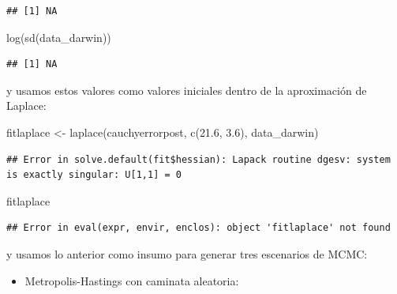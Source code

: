 \documentclass[
  12pt,
]{book}
\newenvironment{Shaded}{\begin{snugshade}}{\end{snugshade}}
\newcommand{\AttributeTok}[1]{\textcolor[rgb]{0.77,0.63,0.00}{#1}}
\newcommand{\FloatTok}[1]{\textcolor[rgb]{0.00,0.00,0.81}{#1}}
\newcommand{\FunctionTok}[1]{\textcolor[rgb]{0.00,0.00,0.00}{#1}}
\newcommand{\NormalTok}[1]{#1}
\newcommand{\OtherTok}[1]{\textcolor[rgb]{0.56,0.35,0.01}{#1}}
\newcommand{\SpecialCharTok}[1]{\textcolor[rgb]{0.00,0.00,0.00}{#1}}
\providecommand{\tightlist}{%
  \setlength{\itemsep}{0pt}\setlength{\parskip}{0pt}}
\begin{document}
\begin{verbatim}
## [1] NA
\end{verbatim}

\begin{Shaded}
\begin{Highlighting}[]
\FunctionTok{log}\NormalTok{(}\FunctionTok{sd}\NormalTok{(data\_darwin))}
\end{Highlighting}
\end{Shaded}

\begin{verbatim}
## [1] NA
\end{verbatim}

y usamos estos valores como valores iniciales dentro de la aproximación
de Laplace:

\begin{Shaded}
\begin{Highlighting}[]
\NormalTok{fitlaplace }\OtherTok{\textless{}{-}} \FunctionTok{laplace}\NormalTok{(cauchyerrorpost, }\FunctionTok{c}\NormalTok{(}\FloatTok{21.6}\NormalTok{, }\FloatTok{3.6}\NormalTok{),}
\NormalTok{    data\_darwin)}
\end{Highlighting}
\end{Shaded}

\begin{verbatim}
## Error in solve.default(fit$hessian): Lapack routine dgesv: system is exactly singular: U[1,1] = 0
\end{verbatim}

\begin{Shaded}
\begin{Highlighting}[]
\NormalTok{fitlaplace}
\end{Highlighting}
\end{Shaded}

\begin{verbatim}
## Error in eval(expr, envir, enclos): object 'fitlaplace' not found
\end{verbatim}

y usamos lo anterior como insumo para generar tres escenarios de MCMC:

\begin{itemize}
\tightlist
\item
  Metropolis-Hastings con caminata aleatoria:
\end{itemize}

\begin{Shaded}
\end{Shaded}
\end{document}
